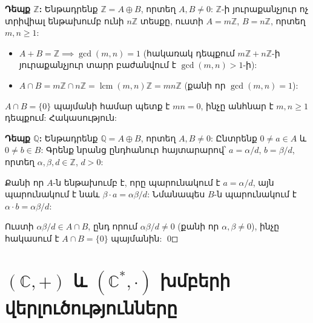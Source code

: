 \documentclass[12pt,a4paper]{article}
\newcommand{\armtext}{} %
\newenvironment{sol}{\begin{mdframed}[style=solstyle]\armtext}{\end{mdframed}}
\newcommand{\Z}{\mathbb{Z}}
\newcommand{\Q}{\mathbb{Q}}
\newcommand{\C}{\mathbb{C}}
\newcommand{\Cstar}{\mathbb{C}^{*}}
\DeclareMathOperator{\lcm}{lcm}
\begin{document}
\begin{sol}
\textbf{\color{SectCol}Դեպք $\Z$:}\;
Ենթադրենք $\Z = A \oplus B$, որտեղ $A, B \neq 0$:
$\Z$-ի յուրաքանչյուր ոչ տրիվիալ ենթախումբ ունի $n\Z$ տեսքը, ուստի $A = m\Z$, $B = n\Z$,
որտեղ $m, n \geq 1$:

\begin{itemize}[leftmargin=*]
  \item $A + B = \Z \implies \gcd(m,n)=1$\; (հակառակ դեպքում $m\Z + n\Z$-ի յուրաքանչյուր տարր
    բաժանվում է $\gcd(m,n) > 1$-ի):
  \item $A \cap B = m\Z \cap n\Z = \lcm(m,n)\Z = mn\Z$\; (քանի որ $\gcd(m,n)=1$):
\end{itemize}

$A \cap B = \{0\}$ պայմանի համար պետք է $mn = 0$, ինչը անհնար է $m,n \geq 1$ դեպքում: Հակասություն:

\begin{center}
\end{center}

\textbf{\color{SectCol}Դեպք $\Q$:}\;
Ենթադրենք $\Q = A \oplus B$, որտեղ $A, B \neq 0$:
Ընտրենք $0 \neq a \in A$ և $0 \neq b \in B$:
Գրենք նրանց ընդհանուր հայտարարով՝ $a = \alpha/d$, $b = \beta/d$,
որտեղ $\alpha, \beta, d \in \Z$, $d > 0$:

Քանի որ $A$-ն ենթախումբ է, որը պարունակում է $a = \alpha/d$, այն պարունակում է նաև
$\beta \cdot a = \alpha\beta/d$: Նմանապես $B$-ն պարունակում է
$\alpha \cdot b = \alpha\beta/d$:

Ուստի $\alpha\beta/d \in A \cap B$, ընդ որում $\alpha\beta/d \neq 0$
(քանի որ $\alpha, \beta \neq 0$),
ինչը հակասում է $A \cap B = \{0\}$ պայմանին: \qed
\end{sol}

\bigskip
\section{\armtext{$(\C,+)$ և $(\Cstar, \cdot)$ խմբերի վերլուծությունները}}
\end{document}
